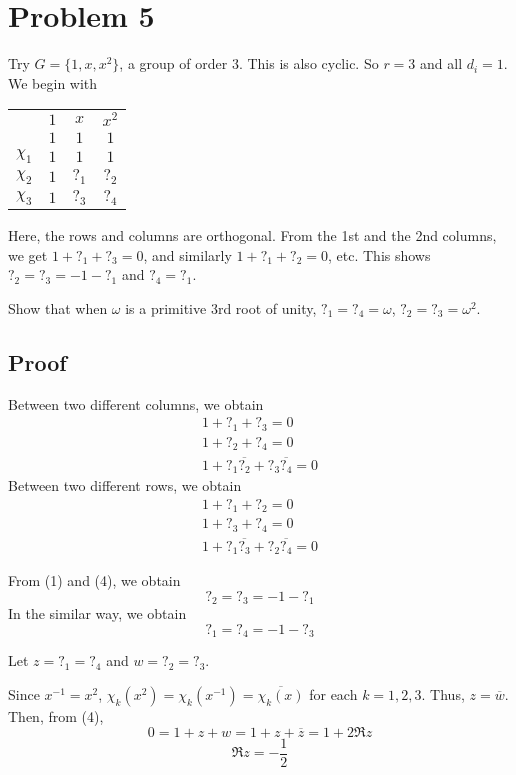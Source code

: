 \section*{Problem 5}

Try \(G = \{1, x, x^2\}\), a group of order \(3\).
This is also cyclic.
So \(r = 3\) and all \(d_i = 1\).
We begin with

\begin{center}
\begin{tabular}{c|ccc}
  & \(1\) & \(x\) & \(x^2\) \\
  & \(1\) & \(1\) & \(1\) \\
  \hline
  \(\chi_1\) & \(1\) & \(1\) & \(1\) \\
  \(\chi_2\) & \(1\) & \(?_1\) & \(?_2\) \\
  \(\chi_3\) & \(1\) & \(?_3\) & \(?_4\)
\end{tabular}
\end{center}

Here, the rows and columns are orthogonal.
From the 1st and the 2nd columns,
we get \(1 + ?_1 + ?_3 = 0\),
and similarly \(1 + ?_1 + ?_2 = 0\), etc.
This shows \(?_2 = ?_3 = -1 - ?_1\) and \(?_4 = ?_1\).

Show that when \(\omega\) is a primitive 3rd root of unity,
\(?_1 = ?_4 = \omega\), \(?_2 = ?_3 = \omega^2\).

\subsection*{Proof}

Between two different columns, we obtain
\begin{gather}
  1 + ?_1 + ?_3 = 0 \\
  1 + ?_2 + ?_4 = 0 \\
  1 + ?_1 \overline{?_2} + ?_3 \overline{?_4} = 0
\end{gather}
Between two different rows, we obtain
\begin{gather}
  1 + ?_1 + ?_2 = 0 \\
  1 + ?_3 + ?_4 = 0 \\
  1 + ?_1 \overline{?_3} + ?_2 \overline{?_4} = 0
\end{gather}

From (1) and (4), we obtain
\[?_2 = ?_3 = -1 - ?_1\]
In the similar way, we obtain
\[?_1 = ?_4 = -1 - ?_3\]

Let \(z = ?_1 = ?_4\) and \(w = ?_2 = ?_3\).

Since \(x^{-1} = x^2\), \(\chi_k(x^2) = \chi_k(x^{-1}) = \overline{\chi_k(x)}\) for each \(k = 1, 2, 3\).
Thus, \(z = \overline{w}\).
Then, from (4),
\[0 = 1 + z + w = 1 + z + \overline{z} = 1 + 2 \Re z\]
\[\Re z = -\frac{1}{2}\]

